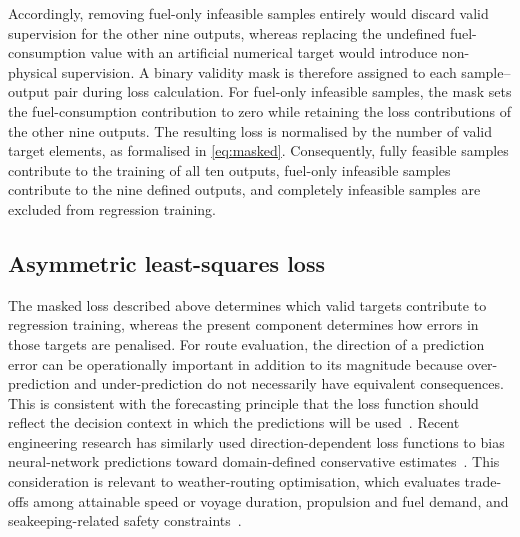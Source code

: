 \documentclass[final,5p,times,twocolumn,numbers]{elsarticle}
\begin{document}
Accordingly, removing fuel-only infeasible samples entirely would discard valid supervision for the other nine outputs, whereas replacing the undefined fuel-consumption value with an artificial numerical target would introduce non-physical supervision. A binary validity mask is therefore assigned to each sample--output pair during loss calculation. For fuel-only infeasible samples, the mask sets the fuel-consumption contribution to zero while retaining the loss contributions of the other nine outputs. The resulting loss is normalised by the number of valid target elements, as formalised in \autoref{eq:masked}. Consequently, fully feasible samples contribute to the training of all ten outputs, fuel-only infeasible samples contribute to the nine defined outputs, and completely infeasible samples are excluded from regression training.
\subsection{Asymmetric least-squares loss}

The masked loss described above determines which valid targets contribute to regression training, whereas the present component determines how errors in those targets are penalised. For route evaluation, the direction of a prediction error can be operationally important in addition to its magnitude because over-prediction and under-prediction do not necessarily have equivalent consequences. This is consistent with the forecasting principle that the loss function should reflect the decision context in which the predictions will be used~\cite{gneiting2011,elliott2005}. Recent engineering research has similarly used direction-dependent loss functions to bias neural-network predictions toward domain-defined conservative estimates~\cite{habib2026asymmetric}. This consideration is relevant to weather-routing optimisation, which evaluates trade-offs among attainable speed or voyage duration, propulsion and fuel demand, and seakeeping-related safety constraints~\cite{pennino2020,kytariolou2022,han2025weather}.
\end{document}
